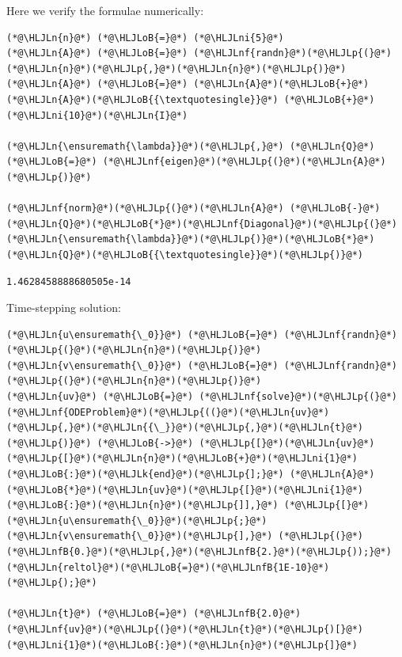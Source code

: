 \documentclass[12pt,a4paper]{article}
\newcommand{\HLJLk}[1]{\textcolor[RGB]{148,91,176}{\textbf{#1}}}
\newcommand{\HLJLn}[1]{#1}
\newcommand{\HLJLnf}[1]{\textcolor[RGB]{66,102,213}{#1}}
\newcommand{\HLJLnfB}[1]{\textcolor[RGB]{59,151,46}{#1}}
\newcommand{\HLJLni}[1]{\textcolor[RGB]{59,151,46}{#1}}
\newcommand{\HLJLoB}[1]{\textcolor[RGB]{102,102,102}{\textbf{#1}}}
\newcommand{\HLJLp}[1]{#1}
\begin{document}
Here we verify the formulae numerically:


\begin{lstlisting}
(*@\HLJLn{n}@*) (*@\HLJLoB{=}@*) (*@\HLJLni{5}@*)
(*@\HLJLn{A}@*) (*@\HLJLoB{=}@*) (*@\HLJLnf{randn}@*)(*@\HLJLp{(}@*)(*@\HLJLn{n}@*)(*@\HLJLp{,}@*)(*@\HLJLn{n}@*)(*@\HLJLp{)}@*) 
(*@\HLJLn{A}@*) (*@\HLJLoB{=}@*) (*@\HLJLn{A}@*)(*@\HLJLoB{+}@*) (*@\HLJLn{A}@*)(*@\HLJLoB{{\textquotesingle}}@*) (*@\HLJLoB{+}@*) (*@\HLJLni{10}@*)(*@\HLJLn{I}@*)

(*@\HLJLn{\ensuremath{\lambda}}@*)(*@\HLJLp{,}@*) (*@\HLJLn{Q}@*) (*@\HLJLoB{=}@*) (*@\HLJLnf{eigen}@*)(*@\HLJLp{(}@*)(*@\HLJLn{A}@*)(*@\HLJLp{)}@*)

(*@\HLJLnf{norm}@*)(*@\HLJLp{(}@*)(*@\HLJLn{A}@*) (*@\HLJLoB{-}@*) (*@\HLJLn{Q}@*)(*@\HLJLoB{*}@*)(*@\HLJLnf{Diagonal}@*)(*@\HLJLp{(}@*)(*@\HLJLn{\ensuremath{\lambda}}@*)(*@\HLJLp{)}@*)(*@\HLJLoB{*}@*)(*@\HLJLn{Q}@*)(*@\HLJLoB{{\textquotesingle}}@*)(*@\HLJLp{)}@*)
\end{lstlisting}

\begin{lstlisting}
1.4628458888680505e-14
\end{lstlisting}


Time-stepping solution:


\begin{lstlisting}
(*@\HLJLn{u\ensuremath{\_0}}@*) (*@\HLJLoB{=}@*) (*@\HLJLnf{randn}@*)(*@\HLJLp{(}@*)(*@\HLJLn{n}@*)(*@\HLJLp{)}@*)
(*@\HLJLn{v\ensuremath{\_0}}@*) (*@\HLJLoB{=}@*) (*@\HLJLnf{randn}@*)(*@\HLJLp{(}@*)(*@\HLJLn{n}@*)(*@\HLJLp{)}@*)
(*@\HLJLn{uv}@*) (*@\HLJLoB{=}@*) (*@\HLJLnf{solve}@*)(*@\HLJLp{(}@*)(*@\HLJLnf{ODEProblem}@*)(*@\HLJLp{((}@*)(*@\HLJLn{uv}@*)(*@\HLJLp{,}@*)(*@\HLJLn{{\_}}@*)(*@\HLJLp{,}@*)(*@\HLJLn{t}@*)(*@\HLJLp{)}@*) (*@\HLJLoB{->}@*) (*@\HLJLp{[}@*)(*@\HLJLn{uv}@*)(*@\HLJLp{[}@*)(*@\HLJLn{n}@*)(*@\HLJLoB{+}@*)(*@\HLJLni{1}@*)(*@\HLJLoB{:}@*)(*@\HLJLk{end}@*)(*@\HLJLp{];}@*) (*@\HLJLn{A}@*)(*@\HLJLoB{*}@*)(*@\HLJLn{uv}@*)(*@\HLJLp{[}@*)(*@\HLJLni{1}@*)(*@\HLJLoB{:}@*)(*@\HLJLn{n}@*)(*@\HLJLp{]],}@*) (*@\HLJLp{[}@*)(*@\HLJLn{u\ensuremath{\_0}}@*)(*@\HLJLp{;}@*) (*@\HLJLn{v\ensuremath{\_0}}@*)(*@\HLJLp{],}@*) (*@\HLJLp{(}@*)(*@\HLJLnfB{0.}@*)(*@\HLJLp{,}@*)(*@\HLJLnfB{2.}@*)(*@\HLJLp{));}@*) (*@\HLJLn{reltol}@*)(*@\HLJLoB{=}@*)(*@\HLJLnfB{1E-10}@*)(*@\HLJLp{);}@*)

(*@\HLJLn{t}@*) (*@\HLJLoB{=}@*) (*@\HLJLnfB{2.0}@*)
(*@\HLJLnf{uv}@*)(*@\HLJLp{(}@*)(*@\HLJLn{t}@*)(*@\HLJLp{)[}@*)(*@\HLJLni{1}@*)(*@\HLJLoB{:}@*)(*@\HLJLn{n}@*)(*@\HLJLp{]}@*)
\end{lstlisting}
\end{document}

